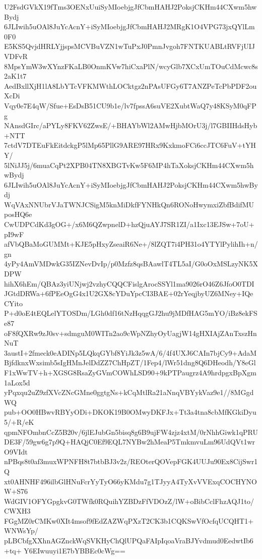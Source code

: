 U2FsdGVkX19fTms3OENxUuiSyMIoebjgJfCbmHAHJ2PoksjCKHm44CXwm5hwBydj
6JLIwih5uOAl8JuYcAcnY+iSyMIoebjgJfCbmHAHJ2MRgK1O4VPG73jxQYlLm0F0
E5KS5QvjdHRLYjjspsMCVBuVZN1wTuPxJ0PmnJvgoh7FNTKUABLtRVFjUIJVDFvR
8MpsYmW3wXYnzFKaLB0OnmKVw7hiCxaPlN/wcyGlb7XCxUmTOuCdMcwc8s2aK1t7
AedBxllXjH1lA8LbYTcVFKMWthLOCktgz2nPAsUFGy6T7ANZPeTcPbPDF2ouXcDi
Vqy0e7E4qW/Sfue+EsDsB51CU9b1e/lv7fpssA6suVE2XubtWaQ7y48KSyM0qFPg
NAnsdGIrc/aPYLy8FKV62ZwsE/+BHAYbWl2AMwHjbMOrU3j/l7GBIIHdsHyb+NTT
7ctdV7DTEuFkEitdckgP5lMp65PllG9ARE97HRx9KxkmoFCi6ccJTC6FuV+tYHY/
5lNiJJ5j/6muaCqPt2XPB04TN8XBGTvKw5F6MP4hTaXoksjCKHm44CXwm5hwBydj
6JLIwih5uOAl8JuYcAcnY+iSyMIoebjgJfCbmHAHJ2PoksjCKHm44CXwm5hwBydj
WqVAxNNUbrVJaTWNJCSigM5knMiDkfFYNHkQn6RONoHwymxiZbfBdifMUposHQ6e
CwUDPCdKd3gOG+/x6M6QZwpnelD+hzQjuAYJ7SR1ZI/a1Ixc13EJSw+7oU+pI9wF
afVbQBaMoGUMMt+KJE5pHxyZseaiR6Ne+/8lZQT7i4PH31o4YTYlPylihIh+n/gn
4yPy4AmVMDwkG35IZNevDvIp/p0Mzfz8qsBAawlT4TL5aI/G0oOxMSLzyNK5XDPW
hihX6hEm/QBAz3yiUNjwj2vzhyCQQCFislgArocSSYl1ma9026rO46Z6JfoO0TDI
JGtdDRWa+6fPEeOgG4x1U2GX8cYDuYpcCI3BAE+02rYeqjbyUZ6MNey+IQeCYito
P+d0oE4tEQLelYTOSDm/LGh0df16tNzHqqgGJ2hu9jMDfHAG5mYO/iBz8ekFSe87
oF8fQXRw9zJ0sv+sdmguM0WITn2ao9cWpNZhyOyUagjW14gHXIAjZAnTxszHnNuT
3austI+2fmeck0eADINp5LQkqGYbf8YiJk3z5wA/6/4f4UXJ6CAIn7bjCy9+AdaM
BjfdknxWxsimb5sIgHMnJelDdZZ7ChHpZT/1Fep4/lWr51dng8Q6DHeodh/Y8eGl
F1xWwTV+h+XGSG8RsaZyGVmCOWhLSD90+9kPTPaugrz4A9hrdpgxBpXgm1aLox5d
yPqxqu2uZ9zfXVcZNcGMne0ggtgNs+kCqMtlRa21aNnqVBYykVaz9e1//8MGgdWQ
pub+OO0HBwvRBYyODi+DKOK19B0OMwyDKFJx+Tt3a4tna8cbMfKGkiDyu5/+R/eK
qpmNFOmbnCcZ5B20v/6jlEJubGn5bisq8g6B9ujFW4zjz4xtM/0rNhhGiwk1qPRU
DE3F/59gw6g7p9Q+HAQjC0Ef9EQL7NYBw2hMeaP5TmkmvuLm96UdQVt1wrO9VIdt
nPBqs8t0af3muxWPNFH8t7btbBJ3v2z/REOterQOVepFGK4UUJu90Ex8CijSwr1Q
xt0AHNHF496ilbGlHNuFcrYyTyO66yKMdu7g1TJyyA4TyXvVVExqCOCHYNOW+S76
WdGIV1OFYGpgkvG0TWfk0RQuihYZBDzFfVDOzZ/lW+oBibCclFhzAQJ1to/CWXH3
FGgMZ0rCMKw0XIt4msof9fEdZAZWqPXzT2CK3b1CQKSwVfOcfqUCQHT1+WNWsYp/
pLBCbfgXXhnAGZnckWqSVKHyChQlUPQaFAIpIqoaVraBJYvdmud0EedwtIb6+tq+
Y6EIwuuyi1E7bYBBEc0cWg==
